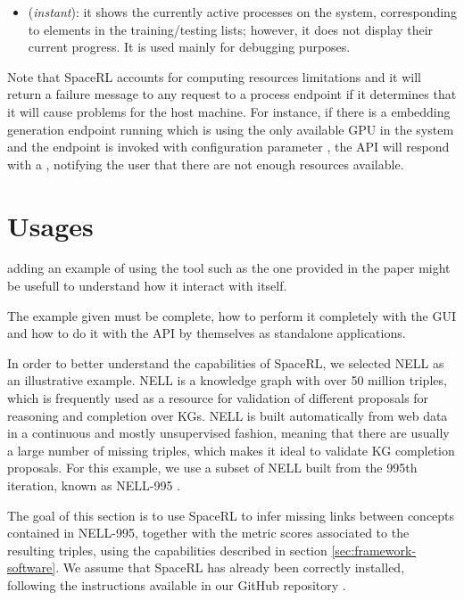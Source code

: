 \begin{itemize}
    \item {} (\emph{instant}): it shows the currently active processes on the system, corresponding to elements in the training/testing lists; however, it does not display their current progress. It is used mainly for debugging purposes.
\end{itemize}

Note that SpaceRL accounts for computing resources limitations and it will return a failure message to any request to a process endpoint if it determines that it will cause problems for the host machine. For instance, if there is a embedding generation endpoint running which is using the only available GPU in the system and the  endpoint is invoked with configuration parameter , the API will respond with a , notifying the user that there are not enough resources available.

\section{Usages}\label{sec:framework-usage}
adding an example of using the tool such as the one provided in the paper might be usefull to understand how it interact with itself.

The example given must be complete, how to perform it completely with the GUI and how to do it with the API by themselves as standalone applications.


In order to better understand the capabilities of SpaceRL,  we selected NELL \cite{mitchell2018} as an illustrative example. NELL is a knowledge graph with over 50 million triples, which is frequently used as a resource for validation of different proposals for reasoning and completion over KGs.  NELL is built automatically from web data in a continuous and mostly unsupervised fashion, meaning that there are usually a large number of missing triples, which makes it ideal to validate KG completion proposals. For this example, we use a subset of NELL built from the 995th iteration, known as NELL-995 \cite{xiong2017deeppath}. 

The goal of this section is to use SpaceRL to infer missing links between concepts contained in NELL-995, together with the metric scores associated to the resulting triples, using the capabilities described in section \ref{sec:framework-software}.  We assume that SpaceRL has already been correctly installed, following the instructions available in our GitHub repository \cite{SpaceRL}.


